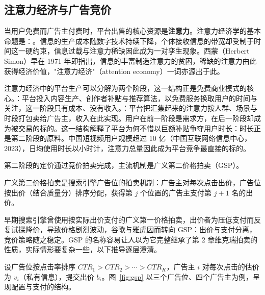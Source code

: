 \subsection{注意力经济与广告竞价}

当用户免费而广告主付费时，平台出售的核心资源是\textbf{注意力}。注意力经济学的基本命题是：。信息的生产成本随数字技术持续下降，个体接收信息的带宽却受制于时间这一硬约束，信息过载与注意力稀缺因此成为一对孪生现象。西蒙（Herbert Simon）早在 1971 年即指出，信息的丰富制造注意力的贫困，稀缺的注意力由此获得经济价值，"注意力经济"（attention economy）一词亦源出于此。

注意力经济中的平台生产可以分解为两个阶段，这一结构正是免费商业模式的核心。：平台投入内容生产、创作者补贴与推荐算法，以免费服务换取用户的时间与关注，这一阶段只有成本、没有收入。：平台把汇集起来的注意力按人群、场景与时段打包卖给广告主，收入在此实现。用户在前一阶段是需求方，在后一阶段却成为被交易的标的。这一结构解释了平台为何不惜以巨额补贴争夺用户时长：时长正是第二阶段的原料。中国短视频用户规模超过 10 亿（中国互联网络信息中心，2023），日均使用时长以小时计，注意力总量因此成为平台竞争最直接的标的。

第二阶段的定价通过竞价拍卖完成，主流机制是广义第二价格拍卖（GSP）。

\begin{definition}
广义第二价格拍卖是搜索引擎广告位的拍卖机制：广告主对每次点击出价，广告位按出价（结合质量分）排序分配，获得第 $j$ 个位置的广告主支付第 $j+1$ 名的出价。
\end{definition}

早期搜索引擎曾使用按实际出价支付的广义第一价格拍卖，出价者为压低支付而反复试探降价，导致价格剧烈波动，谷歌与雅虎因而转向 GSP：出价与支付分离，竞价策略随之稳定。GSP 的名称容易让人以为它完整继承了第 2 章维克瑞拍卖的性质，实际情形要复杂一些，以下推导逐层澄清。

设广告位按点击率排序 $CTR_1 > CTR_2 > \cdots > CTR_K$，广告主 $i$ 对每次点击的估价为 $v_i$（私有信息），提交出价 $b_i$。图~\ref{fig:gsp} 以三个广告位、四个广告主为例，呈现配置与支付的结构。

